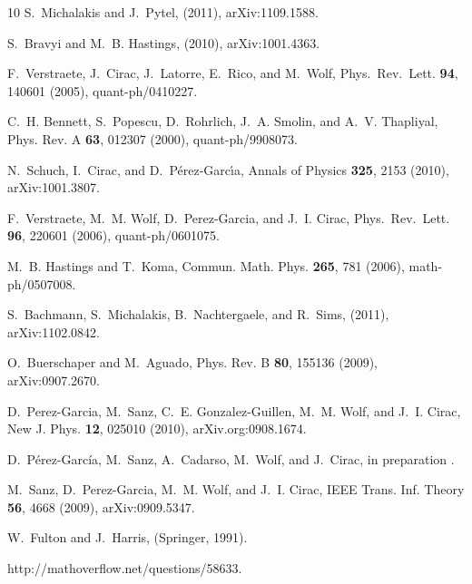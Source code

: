 \documentclass[twocolumn,superscriptaddress,prb,linenumbers]{revtex4-1}
\begin{document}
\begin{thebibliography}{10}
    S.~{Michalakis} and J.~{Pytel},
    \newblock (2011), arXiv:1109.1588.

    S.~{Bravyi} and M.~B. {Hastings},
    \newblock (2010), arXiv:1001.4363.

    F.~Verstraete, J.~Cirac, J.~Latorre, E.~Rico, and M.~Wolf,
    \newblock Phys.\ Rev.\ Lett. {\bf 94}, 140601 (2005), quant-ph/0410227.

    C.~H. Bennett, S.~Popescu, D.~Rohrlich, J.~A. Smolin, and A.~V. Thapliyal,
    \newblock Phys. Rev. A {\bf 63}, 012307 (2000), quant-ph/9908073.

    N.~{Schuch}, I.~{Cirac}, and D.~{P{\'e}rez-Garc{\'{\i}}a},
    \newblock Annals of Physics {\bf 325}, 2153 (2010), arXiv:1001.3807.

    F.~Verstraete, M.~M. Wolf, D.~Perez-Garcia, and J.~I. Cirac,
    \newblock Phys.\ Rev.\ Lett. {\bf 96}, 220601 (2006), quant-ph/0601075.

    M.~B. {Hastings} and T.~{Koma},
    \newblock Commun. Math. Phys. {\bf 265}, 781 (2006), math-ph/0507008.

    S.~{Bachmann}, S.~{Michalakis}, B.~{Nachtergaele}, and R.~{Sims},
    \newblock (2011), arXiv:1102.0842.

    O.~{Buerschaper} and M.~{Aguado},
    \newblock Phys. Rev. B {\bf 80}, 155136 (2009), arXiv:0907.2670.

    D.~Perez-Garcia, M.~Sanz, C.~E. Gonzalez-Guillen, M.~M. Wolf, and J.~I. Cirac,
    \newblock New J. Phys. {\bf 12}, 025010 (2010), arXiv.org:0908.1674.

    D.~P\'erez-Garc\'ia, M.~Sanz, A.~Cadarso, M.~Wolf, and J.~Cirac,
    \newblock in preparation .

    M.~Sanz, D.~Perez-Garcia, M.~M. Wolf, and J.~I. Cirac,
    \newblock IEEE Trans. Inf. Theory {\bf 56}, 4668 (2009), arXiv:0909.5347.

    W.~Fulton and J.~Harris,
     (Springer, 1991).

    http://mathoverflow.net/questions/58633.


\end{thebibliography}
\end{document}
